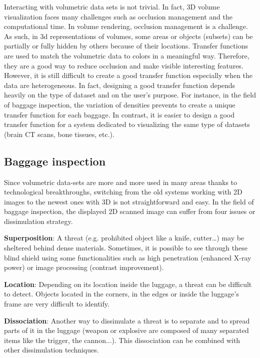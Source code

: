   Interacting with volumetric data sets is not trivial. In fact, 3D volume visualization faces many challenges such as occlusion management and the computational time.
 In volume rendering, occlusion management is a challenge. As such, in 3d representations of volumes, some areas or objects (subsets) can be partially or fully hidden by others because of their locations. Transfer functions are used to match the volumetric data to colors in a meaningful way. Therefore, they are a good way to reduce occlusion and make visible interesting features.  However, it is still difficult to create a good transfer function especially when the data are heterogeneous. In fact, designing a good transfer function depends heavily on the type of dataset and on the user's purpose. For instance, in the field of baggage inspection, the variation of densities prevents to create a unique transfer function for each baggage. In contrast, it is easier to design a good transfer function for a system dedicated to visualizing the same type of datasets (brain CT scans, bone tissues, etc.). 
 
 \subsection{Baggage inspection}
 
  Since volumetric data-sets are more and more used in many areas thanks to technological breakthroughs, switching from the old systems working with 2D images to the newest ones with 3D is not straightforward and easy.  In the field of baggage inspection, the displayed 2D scanned image can suffer from four issues or dissimulation strategy.

\textbf{Superposition}: A threat (e.g. prohibited object like a knife, cutter…) may be sheltered behind dense materials. Sometimes, it is possible to see through these blind shield using some functionalities such as high penetration (enhanced X-ray power) or image processing (contrast improvement). 

\textbf{Location}: Depending on its location inside the luggage, a threat can be difficult to detect. Objects located in the corners, in the edges or inside the luggage's frame are very difficult to identify.

\textbf{Dissociation}: Another way to dissimulate a threat is to separate and to spread parts of it in the luggage (weapon or explosive are composed of many separated items like the trigger, the cannon...). This dissociation can be combined with other dissimulation techniques.

